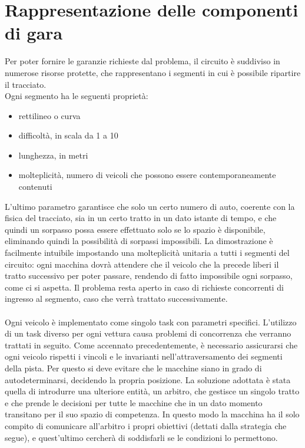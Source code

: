 \section{Rappresentazione delle componenti di gara}
Per poter fornire le garanzie richieste dal problema, il circuito è suddiviso in numerose risorse protette, che rappresentano i segmenti in cui è possibile ripartire il tracciato.\\
Ogni segmento ha le seguenti proprietà:
\begin{itemize}
 \item rettilineo o curva
 \item difficoltà, in scala da 1 a 10
 \item lunghezza, in metri
 \item molteplicità, numero di veicoli che possono essere contemporaneamente contenuti
\end{itemize} 
L'ultimo parametro garantisce che solo un certo numero di auto, coerente con la fisica del tracciato, sia in un certo tratto in un dato istante di tempo, e che quindi un sorpasso possa essere effettuato solo se lo spazio è disponibile, eliminando quindi la possibilità di sorpassi impossibili. La dimostrazione è facilmente intuibile impostando una molteplicità unitaria a tutti i segmenti del circuito: ogni macchina dovrà attendere che il veicolo che la precede liberi il tratto successivo per poter passare, rendendo di fatto impossibile ogni sorpasso, come ci si aspetta.
Il problema resta aperto in caso di richieste concorrenti di ingresso al segmento, caso che verrà trattato successivamente.
\\
\\
Ogni veicolo è implementato come singolo task con parametri specifici. L'utilizzo di un task diverso per ogni vettura causa problemi di concorrenza che verranno trattati in seguito. Come accennato precedentemente, è necessario assicurarsi che ogni veicolo rispetti i vincoli e le invarianti nell’attraversamento dei segmenti della pista. Per questo si deve evitare che le macchine siano in grado di autodeterminarsi, decidendo la propria posizione. La soluzione adottata è stata quella di introdurre una ulteriore entità, un arbitro, che gestisce un singolo tratto e che prende le decisioni per tutte le macchine che in un dato momento transitano per il suo spazio di competenza.
In questo modo la macchina ha il solo compito di comunicare all’arbitro i propri obiettivi (dettati dalla strategia che segue), e quest’ultimo cercherà di soddisfarli se le condizioni lo permettono.